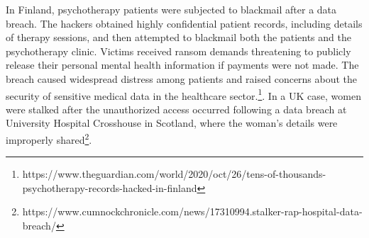 \documentclass{article}
\begin{document}
In Finland, psychotherapy patients were subjected to blackmail after a data breach. The hackers obtained highly confidential patient records, including details of therapy sessions, and then attempted to blackmail both the patients and the psychotherapy clinic. Victims received ransom demands threatening to publicly release their personal mental health information if payments were not made. The breach caused widespread distress among patients and raised concerns about the security of sensitive medical data in the healthcare sector.\footnote{https://www.theguardian.com/world/2020/oct/26/tens-of-thousands-psychotherapy-records-hacked-in-finland}. 
In a UK case, women were stalked after the unauthorized access occurred following a data breach at University Hospital Crosshouse in Scotland, where the woman's details were improperly shared\footnote{https://www.cumnockchronicle.com/news/17310994.stalker-rap-hospital-data-breach/}. 
\newline
\end{document}
